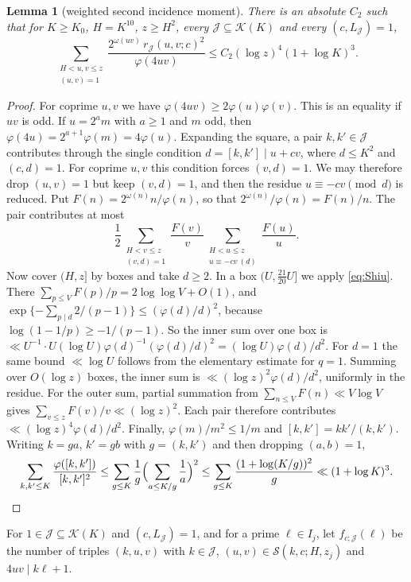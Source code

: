 \documentclass[10pt,reqno]{amsart}
\newtheorem{lemma}[theorem]{Lemma}
\theoremstyle{remark}
\newcommand{\K}{\mathcal K}
\newcommand{\J}{\mathcal J}
\newcommand{\Sset}{\mathcal S}
\begin{document}
\begin{lemma}[weighted second incidence moment]\label{lem:wsecond}
There is an absolute $C_2$ such that for $K\geq K_0$, $H=K^{10}$,
$z\geq H^2$, every $\J\subseteq\K(K)$ and every $(c,L_\J)=1$,
\begin{equation}\label{eq:wsecond}
 \sum_{\substack{H<u,v\leq z\\(u,v)=1}}
 \frac{2^{\omega(uv)}\,r_\J(u,v;c)^2}{\varphi(4uv)}
 \leq C_2(\log z)^4(1+\log K)^3.
\end{equation}
\end{lemma}
\begin{proof}
For coprime $u,v$ we have $\varphi(4uv)\geq2\varphi(u)\varphi(v)$.  This
is an equality if $uv$ is odd.  If $u=2^am$ with $a\geq1$ and $m$ odd,
then $\varphi(4u)=2^{a+1}\varphi(m)=4\varphi(u)$.  Expanding the square,
a pair $k,k'\in\J$ contributes through the single condition
$d=[k,k']\mid u+cv$, where $d\leq K^2$ and $(c,d)=1$.  For coprime $u,v$
this condition forces $(v,d)=1$.  We may therefore drop $(u,v)=1$ but
keep $(v,d)=1$, and then the residue $u\equiv-cv\pmod d$ is reduced.  Put
$F(n)=2^{\omega(n)}n/\varphi(n)$, so that
$2^{\omega(n)}/\varphi(n)=F(n)/n$.  The pair contributes at most
\[
 \frac12\sum_{\substack{H<v\leq z\\(v,d)=1}}\frac{F(v)}v
 \sum_{\substack{H<u\leq z\\u\equiv-cv\ (d)}}\frac{F(u)}u .
\]
Now cover $(H,z]$ by boxes and take $d\geq2$.  In a box $(U,\frac{21}{20}U]$
we apply \eqref{eq:Shiu}.  There $\sum_{p\leq V}F(p)/p=2\log\log V+O(1)$,
and $\exp\{-\sum_{p\mid d}2/(p-1)\}\leq(\varphi(d)/d)^2$, because
$\log(1-1/p)\geq-1/(p-1)$.  So the inner sum over one box is
$\ll U^{-1}\cdot U(\log U)\varphi(d)^{-1}(\varphi(d)/d)^2=(\log U)\varphi(d)/d^2$.
For $d=1$ the same bound $\ll\log U$ follows from the elementary estimate
for $q=1$.  Summing over $O(\log z)$ boxes, the inner sum is
$\ll(\log z)^2\varphi(d)/d^2$, uniformly in the residue.  For the outer
sum, partial summation from $\sum_{n\leq V}F(n)\ll V\log V$ gives
$\sum_{v\leq z}F(v)/v\ll(\log z)^2$.  Each pair therefore contributes
$\ll(\log z)^4\varphi(d)/d^2$.  Finally, $\varphi(m)/m^2\leq1/m$ and
$[k,k']=kk'/(k,k')$.  Writing $k=ga$, $k'=gb$ with $g=(k,k')$ and then
dropping $(a,b)=1$,
\[
 \sum_{k,k'\leq K}\frac{\varphi([k,k'])}{[k,k']^2}
 \leq\sum_{g\leq K}\frac1g\Bigl(\sum_{a\leq K/g}\frac1a\Bigr)^2
 \leq\sum_{g\leq K}\frac{(1+\log(K/g))^2}g\ll(1+\log K)^3.\qedhere
\]
\end{proof}

For $1\in\J\subseteq\K(K)$ and $(c,L_\J)=1$, and for a prime $\ell\in I_j$,
let $f_{c;\J}(\ell)$ be the number of triples $(k,u,v)$ with $k\in\J$,
$(u,v)\in\Sset(k,c;H,z_j)$ and $4uv\mid k\ell+1$.
\end{document}
